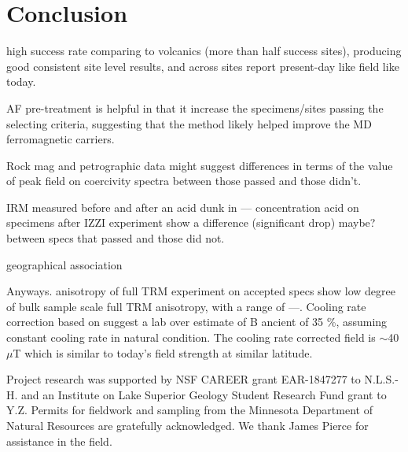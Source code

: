 \documentclass[draft]{agujournal2019}
\begin{document}






\section*{Conclusion}
high success rate comparing to volcanics (more than half success sites), producing good consistent site level results, and across sites report present-day like field like today.

AF pre-treatment is helpful in that it increase the specimens/sites passing the selecting criteria, suggesting that the method likely helped improve the MD ferromagnetic carriers. 

Rock mag and petrographic data might suggest differences in terms of the value of peak field on coercivity spectra between those passed and those didn't.  

IRM measured before and after an acid dunk in --- concentration acid on specimens after IZZI experiment show a difference (significant drop) maybe? between specs that passed and those did not.

geographical association

Anyways. anisotropy of full TRM experiment on accepted specs show low degree of bulk sample scale full TRM anisotropy, with a range of ---. Cooling rate correction based on \cite{Halgedahl1980a} suggest a lab over estimate of B ancient of 35 \%, assuming constant cooling rate in natural condition. The cooling rate corrected field is $\sim$40 $\mu$T which is similar to today's field strength at similar latitude. 

\acknowledgments
Project research was supported by NSF CAREER grant EAR-1847277 to N.L.S.-H. and an Institute on Lake Superior Geology Student Research Fund grant to Y.Z. Permits for fieldwork and sampling from the Minnesota Department of Natural Resources are gratefully acknowledged. We thank James Pierce for assistance in the field.
\end{document}

